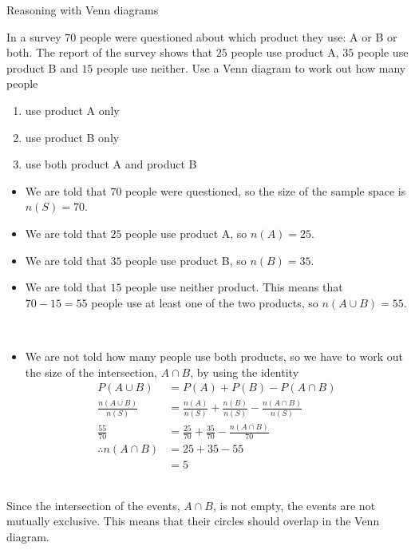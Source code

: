 \begin{wex}{Reasoning with Venn diagrams}
{
\begin{minipage}{\textwidth}
In a survey $70$ people were questioned about which product they
  use: A or B or both. The report of the survey shows that $25$
  people use product A, $35$ people use product B and $15$ people use
  neither. Use a Venn diagram to work out how many people
  \begin{enumerate}[itemsep=5pt, label=\textbf{\arabic*}. ]
  \item use product A only
  \item use product B only
  \item use both product A and product B
  \end{enumerate}
\end{minipage}
}{
 \begin{minipage}{0.8\textwidth}
 \vspace*{1em}
  \begin{itemize}[noitemsep]
  \item We are told that $70$ people were questioned, so the size of the
    sample space is $n(S) = 70$.
  \item We are told that $25$ people use product A, so $n(A) = 25$.
  \item We are told that $35$ people use product B, so $n(B) = 35$.
  \item We are told that $15$ people use neither product. This means
    that $70-15=55$ people use at least one of the two products, so
    $n(A \cup B) = 55$.
  \end{itemize}
  \end{minipage}\\
  \begin{minipage}{0.8\textwidth}
  \begin{itemize}
  \item We are not told how many people use both products, so we have
    to work out the size of the intersection, $A \cap B$, by using the
    identity
    \begin{align*}
      P(A \cup B) &= P(A) + P(B) - P(A \cap B) \\
      \frac{n(A \cup B)}{n(S)} &= \frac{n(A)}{n(S)} + \frac{n(B)}{n(S)} - \frac{n(A \cap B)}{n(S)} \\
      \frac{55}{70} &= \frac{25}{70} + \frac{35}{70} - \frac{n(A \cap B)}{70} \\
      \therefore n(A \cap B) &= 25 + 35 - 55 \\
      &= 5
    \end{align*}
  \end{itemize}
 \end{minipage}\\
  Since the intersection of the events, $A \cap B$, is not empty, the
  events are not mutually exclusive. This means that their circles
  should overlap in the Venn diagram.

}
\end{wex}
